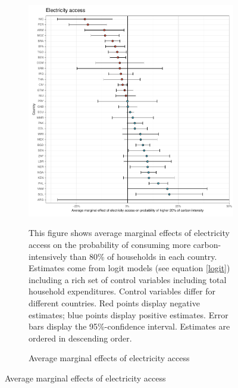  \begin{figure}[ht!]\ContinuedFloat
   \centering
   \begin{subfigure}[b]{\textwidth}
   \centering
   \includegraphics{1_Figures/Analysis_Logit_Models_Marginal_Effects/Average_Marginal_Effects_affected_upper_80_electricity.access_2017B.pdf}
   \caption{Average marginal effects of electricity access} \label{fig:Logit_ME_electricity}
   \begin{subcaption2}
     This figure shows average marginal effects of electricity access on the probability of consuming more carbon-intensively than 80\% of households in each country. Estimates come from logit models (see equation \ref{logit}) including a rich set of control variables including total household expenditures. Control variables differ for different countries. Red points display negative estimates; blue points display positive estimates. Error bars display the 95\%-confidence interval. Estimates are ordered in descending order.
   \end{subcaption2}
   \end{subfigure}
 \end{figure}
 \clearpage

